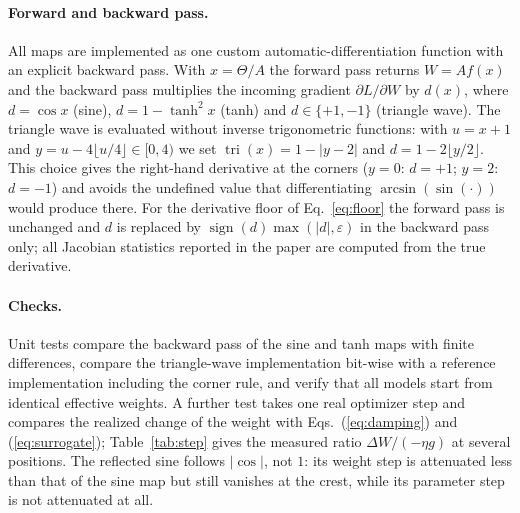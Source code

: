 \documentclass[11pt,a4paper]{article}
\newcommand{\tri}{\operatorname{tri}}
\begin{document}
\paragraph{Forward and backward pass.} All maps are implemented as one custom automatic-differentiation
function with an explicit backward pass. With $x=\Theta/A$ the forward pass returns $W=A f(x)$ and the backward
pass multiplies the incoming gradient $\partial L/\partial W$ by $d(x)$, where $d=\cos x$ (sine),
$d=1-\tanh^2x$ (tanh) and $d\in\{+1,-1\}$ (triangle wave). The triangle wave is evaluated without inverse
trigonometric functions: with $u=x+1$ and $y=u-4\lfloor u/4\rfloor\in[0,4)$ we set $\tri(x)=1-|y-2|$ and
$d=1-2\lfloor y/2\rfloor$. This choice gives the right-hand derivative at the corners ($y=0$: $d=+1$; $y=2$:
$d=-1$) and avoids the undefined value that differentiating $\arcsin(\sin(\cdot))$ would produce there.
For the derivative floor of Eq.~\eqref{eq:floor} the forward pass is unchanged and $d$ is replaced by
$\operatorname{sign}(d)\max(|d|,\varepsilon)$ in the backward pass only; all Jacobian statistics reported in
the paper are computed from the true derivative.

\paragraph{Checks.} Unit tests compare the backward pass of the sine and tanh maps with finite differences,
compare the triangle-wave implementation bit-wise with a reference implementation including the corner rule,
and verify that all models start from identical effective weights. A further test takes one real optimizer step and compares the realized change of the weight with
Eqs.~(\ref{eq:damping}) and (\ref{eq:surrogate}); Table~\ref{tab:step} gives the measured ratio
$\Delta W/(-\eta g)$ at several positions. The reflected sine follows $|\cos|$, not $1$: its weight step is
attenuated less than that of the sine map but still vanishes at the crest, while its parameter step is not
attenuated at all.
\end{document}
